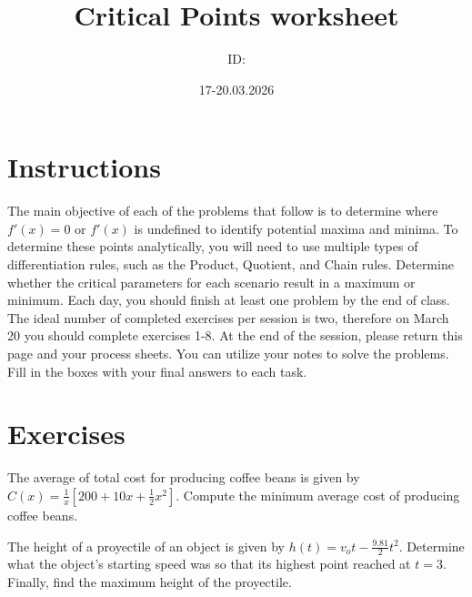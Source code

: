 \documentclass[11pt, a4paper, oneside]{article}
\author{ID:}
\date{17-20.03.2026}
\title{Critical Points worksheet}
\begin{document}
    \maketitle

    \section*{Instructions}
    The main objective of each of the problems that follow is to determine where \(f'(x) = 0\) or \(f'(x)\) is undefined to identify potential maxima and minima. 
    To determine these points analytically, you will need to use multiple types of differentiation rules, such as the Product, Quotient, and Chain rules. 
    Determine whether the critical parameters for each scenario result in a maximum or minimum.
    Each day, you should finish at least one problem by the end of class.
    The ideal number of completed exercises per session is two, therefore on March 20 you should complete exercises 1-8.
    At the end of the session, please return this page and your process sheets.
    You can utilize your notes to solve the problems.
    Fill in the boxes with your final answers to each task.

	\section*{Exercises}

    
    The average of total cost for producing coffee beans is given by 
    \(C(x) = \frac{1}{x}\left[ 200 +10x + \frac{1}{2}x^2 \right]\).
    Compute the minimum average cost of producing coffee beans.

    \boxarea[2cm]

	
    
    The height of a proyectile of an object is given by 
    \(h(t) = v_o t -\frac{9.81}{2}t^2\).
    Determine what the object's starting speed was so that its highest point reached at $t=3$.
    Finally, find the maximum height of the proyectile.

    \boxarea[2cm]

    
\end{document}
